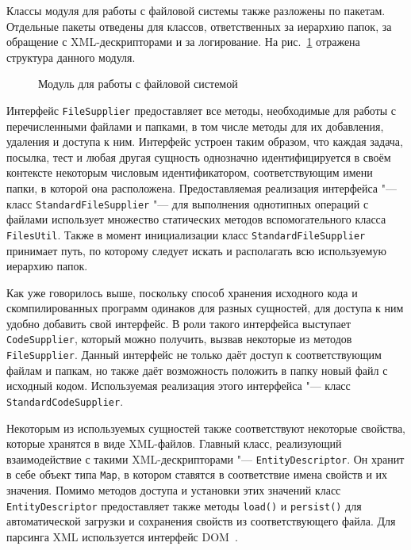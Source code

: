 Классы модуля для работы с файловой системы также разложены по пакетам. Отдельные пакеты отведены для классов, ответственных за иерархию папок, за обращение с XML-дескрипторами и за логирование. На рис.~\ref{package_diagram_file_system} отражена структура данного модуля.

\begin{figure}[h]
\caption{Модуль для работы с файловой системой}
\label{package_diagram_file_system}
\end{figure}

Интерфейс \texttt{File\-Supplier} предоставляет все методы, необходимые для работы с перечисленными файлами и папками, в том числе методы для их добавления, удаления и доступа к ним. Интерфейс устроен таким образом, что каждая задача, посылка, тест и любая другая сущность однозначно идентифицируется в своём контексте некоторым числовым идентификатором, соответствующим имени папки, в которой она расположена. Предоставляемая реализация интерфейса "--- класс \texttt{Standard\-File\-Supplier} "--- для выполнения однотипных операций с файлами использует множество статических методов вспомогательного класса \texttt{Files\-Util}. Также в момент инициализации класс \texttt{Standard\-File\-Supplier} принимает путь, по которому следует искать и располагать всю используемую иерархию папок.

Как уже говорилось выше, поскольку способ хранения исходного кода и скомпилированных программ одинаков для разных сущностей, для доступа к ним удобно добавить свой интерфейс. В роли такого интерфейса выступает \texttt{Code\-Supplier}, который можно получить, вызвав некоторые из методов \texttt{File\-Supplier}. Данный интерфейс не только даёт доступ к соответствующим файлам и папкам, но также даёт возможность положить в папку новый файл с исходный кодом. Используемая реализация этого интерфейса "--- класс \texttt{Standard\-Code\-Supplier}.

Некоторым из используемых сущностей также соответствуют некоторые свойства, которые хранятся в виде XML-файлов. Главный класс, реализующий взаимодействие с такими XML-дескрипторами "--- \texttt{Entity\-Descriptor}. Он хранит в себе объект типа \texttt{Map}, в котором ставятся в соответствие имена свойств и их значения. Помимо методов доступа и установки этих значений класс \texttt{Entity\-Descriptor} предоставляет также методы \texttt{load()} и \texttt{persist()} для автоматической загрузки и сохранения свойств из соответствующего файла. Для парсинга XML используется интерфейс DOM~\cite{cornell2}.

